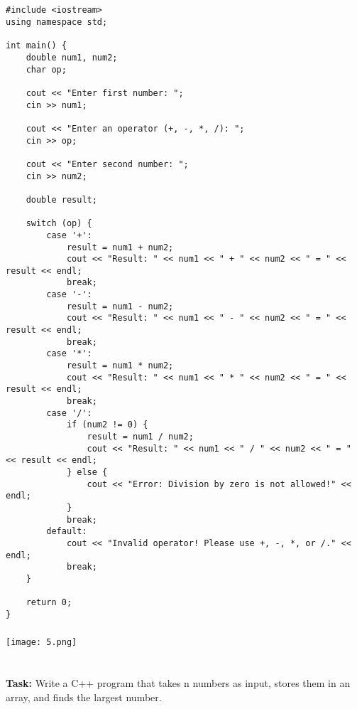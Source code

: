 \documentclass[12pt,a4paper]{article}
\begin{document}
\subsection{}
\begin{lstlisting}
#include <iostream>
using namespace std;

int main() {
    double num1, num2;
    char op;

    cout << "Enter first number: ";
    cin >> num1;

    cout << "Enter an operator (+, -, *, /): ";
    cin >> op;

    cout << "Enter second number: ";
    cin >> num2;

    double result;

    switch (op) {
        case '+':
            result = num1 + num2;
            cout << "Result: " << num1 << " + " << num2 << " = " << result << endl;
            break;
        case '-':
            result = num1 - num2;
            cout << "Result: " << num1 << " - " << num2 << " = " << result << endl;
            break;
        case '*':
            result = num1 * num2;
            cout << "Result: " << num1 << " * " << num2 << " = " << result << endl;
            break;
        case '/':
            if (num2 != 0) {
                result = num1 / num2;
                cout << "Result: " << num1 << " / " << num2 << " = " << result << endl;
            } else {
                cout << "Error: Division by zero is not allowed!" << endl;
            }
            break;
        default:
            cout << "Invalid operator! Please use +, -, *, or /." << endl;
            break;
    }

    return 0;
}

\end{lstlisting}

\subsubsection{}
\begin{center}
    \texttt{[image: 5.png]}
\end{center}


\section{}
\textbf{Task:} Write a C++ program that takes n numbers as input, stores them in an array, and finds the largest number.
\end{document}
